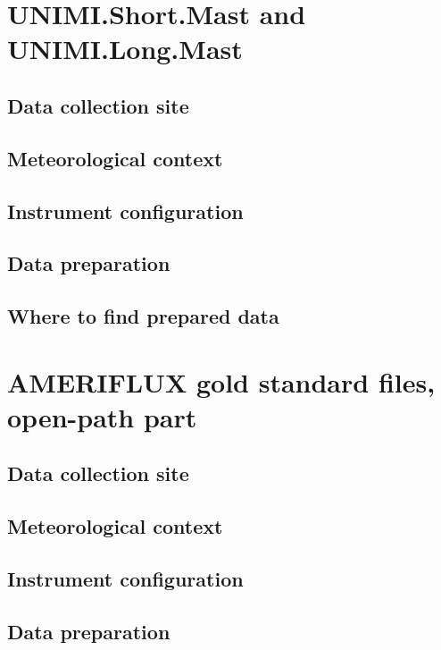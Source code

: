 \documentclass[a4paper,10pt]{book}
\begin{document}
\section{UNIMI.Short.Mast and UNIMI.Long.Mast}

\subsection{Data collection site}

\subsection{Meteorological context}

\subsection{Instrument configuration}

\subsection{Data preparation}

\subsection{Where to find prepared data}


\section{AMERIFLUX gold standard files, open-path part}\label{sec:AMERIFLUX open gold}

\subsection{Data collection site}

\subsection{Meteorological context}

\subsection{Instrument configuration}

\subsection{Data preparation}
\end{document}
